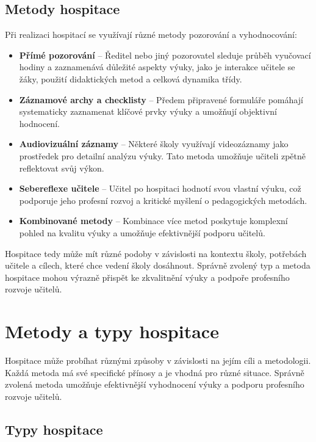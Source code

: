\subsection{Metody hospitace}

Při realizaci hospitací se využívají různé metody pozorování a vyhodnocování:

\begin{itemize}
    \item \textbf{Přímé pozorování} – Ředitel nebo jiný pozorovatel sleduje průběh vyučovací hodiny a zaznamenává důležité aspekty výuky, jako je interakce učitele se žáky, použití didaktických metod a celková dynamika třídy.
    \item \textbf{Záznamové archy a checklisty} – Předem připravené formuláře pomáhají systematicky zaznamenat klíčové prvky výuky a umožňují objektivní hodnocení.
    \item \textbf{Audiovizuální záznamy} – Některé školy využívají videozáznamy jako prostředek pro detailní analýzu výuky. Tato metoda umožňuje učiteli zpětně reflektovat svůj výkon.
    \item \textbf{Sebereflexe učitele} – Učitel po hospitaci hodnotí svou vlastní výuku, což podporuje jeho profesní rozvoj a kritické myšlení o pedagogických metodách.
    \item \textbf{Kombinované metody} – Kombinace více metod poskytuje komplexní pohled na kvalitu výuky a umožňuje efektivnější podporu učitelů.
\end{itemize}

Hospitace tedy může mít různé podoby v závislosti na kontextu školy, potřebách učitele a cílech, které chce vedení školy dosáhnout. Správně zvolený typ a metoda hospitace mohou výrazně přispět ke zkvalitnění výuky a podpoře profesního rozvoje učitelů.


\section{Metody a typy hospitace}

Hospitace může probíhat různými způsoby v závislosti na jejím cíli a metodologii. Každá metoda má své specifické přínosy a je vhodná pro různé situace. Správně zvolená metoda umožňuje efektivnější vyhodnocení výuky a podporu profesního rozvoje učitelů.

\subsection{Typy hospitace}

